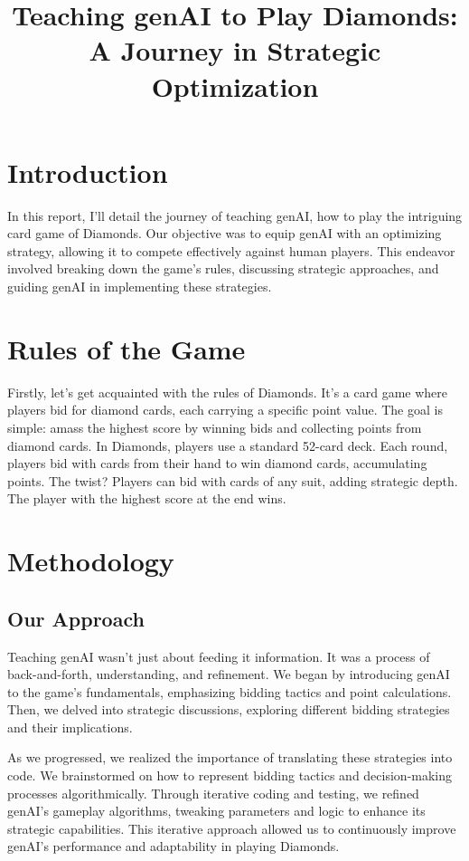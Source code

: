 \documentclass{article}
\title{Teaching genAI to Play Diamonds: A Journey in Strategic Optimization}
\author{}
\date{}
\begin{document}
\maketitle

\section*{Introduction}
In this report, I'll detail the journey of teaching genAI, how to play the intriguing card game of Diamonds. Our objective was to equip genAI with an optimizing strategy, allowing it to compete effectively against human players. This endeavor involved breaking down the game's rules, discussing strategic approaches, and guiding genAI in implementing these strategies.

\section*{Rules of the Game}
Firstly, let's get acquainted with the rules of Diamonds. It's a card game where players bid for diamond cards, each carrying a specific point value. The goal is simple: amass the highest score by winning bids and collecting points from diamond cards.
In Diamonds, players use a standard 52-card deck. Each round, players bid with cards from their hand to win diamond cards, accumulating points. The twist? Players can bid with cards of any suit, adding strategic depth. The player with the highest score at the end wins.


\section*{Methodology}
\subsection*{Our Approach}
Teaching genAI wasn't just about feeding it information. It was a process of back-and-forth, understanding, and refinement. We began by introducing genAI to the game's fundamentals, emphasizing bidding tactics and point calculations. Then, we delved into strategic discussions, exploring different bidding strategies and their implications.

As we progressed, we realized the importance of translating these strategies into code. We brainstormed on how to represent bidding tactics and decision-making processes algorithmically. Through iterative coding and testing, we refined genAI's gameplay algorithms, tweaking parameters and logic to enhance its strategic capabilities. This iterative approach allowed us to continuously improve genAI's performance and adaptability in playing Diamonds.
\end{document}
